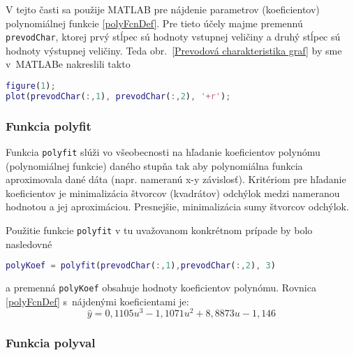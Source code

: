 \documentclass[a4paper, 10pt, ]{article}
\begin{document}
V tejto časti sa použije MATLAB pre nájdenie parametrov (koeficientov) polynomiálnej funkcie \eqref{polyFcnDef}. Pre tieto účely majme premennú \verb|prevodChar|, ktorej prvý stĺpec sú hodnoty vstupnej veličiny a druhý stĺpec sú hodnoty výstupnej veličiny. Teda obr.~\ref{Prevodová charakteristika graf} by sme v~MATLABe nakreslili takto
\begin{lstlisting}[language=Matlab, numbers=none]
figure(1);
plot(prevodChar(:,1), prevodChar(:,2), '+r');
\end{lstlisting}


\subsubsection{Funkcia polyfit}

Funkcia \verb|polyfit| slúži vo všeobecnosti na hľadanie koeficientov polynómu (polynomiálnej funkcie) daného stupňa tak aby polynomiálna funkcia aproximovala dané dáta (napr. nameranú x-y závislosť). Kritériom pre hľadanie koeficientov je minimalizácia štvorcov (kvadrátov) odchýlok medzi nameranou hodnotou a jej aproximáciou. Presnejšie, minimalizácia sumy štvorcov odchýlok.

Použitie funkcie \verb|polyfit| v tu uvažovanom konkrétnom prípade by bolo nasledovné
\begin{lstlisting}[language=Matlab, numbers=none]
polyKoef = polyfit(prevodChar(:,1),prevodChar(:,2), 3)
\end{lstlisting}
a premenná \verb|polyKoef| obsahuje hodnoty koeficientov polynómu. Rovnica \eqref{polyFcnDef} s~nájdenými koeficientami je:
\begin{equation} \label{modelPolifitVysl}
    \hat y = 0,1105 u^3  -1,1071 u^2 + 8,8873 u  -1,146
\end{equation}


\subsubsection{Funkcia polyval}
\end{document}
